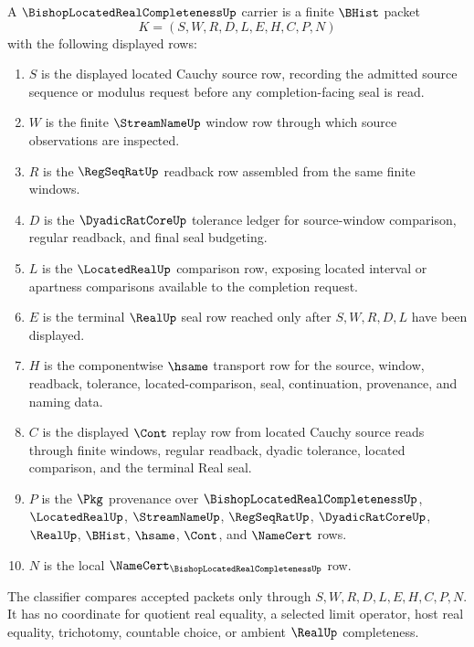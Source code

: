 \begin{definition}
\label{def:bishop-located-real-completeness-carrier}
A $\BishopLocatedRealCompletenessUp$ carrier is a finite $\BHist$ packet
$$
K=(S,W,R,D,L,E,H,C,P,N)
$$
with the following displayed rows:
\begin{enumerate}
\item $S$ is the displayed located Cauchy source row, recording the admitted source sequence or modulus request before any completion-facing seal is read.
\item $W$ is the finite $\StreamNameUp$ window row through which source observations are inspected.
\item $R$ is the $\RegSeqRatUp$ readback row assembled from the same finite windows.
\item $D$ is the $\DyadicRatCoreUp$ tolerance ledger for source-window comparison, regular readback, and final seal budgeting.
\item $L$ is the $\LocatedRealUp$ comparison row, exposing located interval or apartness comparisons available to the completion request.
\item $E$ is the terminal $\RealUp$ seal row reached only after $S,W,R,D,L$ have been displayed.
\item $H$ is the componentwise $\hsame$ transport row for the source, window, readback, tolerance, located-comparison, seal, continuation, provenance, and naming data.
\item $C$ is the displayed $\Cont$ replay row from located Cauchy source reads through finite windows, regular readback, dyadic tolerance, located comparison, and the terminal Real seal.
\item $P$ is the $\Pkg$ provenance over $\BishopLocatedRealCompletenessUp$, $\LocatedRealUp$, $\StreamNameUp$, $\RegSeqRatUp$, $\DyadicRatCoreUp$, $\RealUp$, $\BHist$, $\hsame$, $\Cont$, and $\NameCert$ rows.
\item $N$ is the local $\NameCert_{\BishopLocatedRealCompletenessUp}$ row.
\end{enumerate}
The classifier compares accepted packets only through $S,W,R,D,L,E,H,C,P,N$. It has no coordinate for quotient real equality, a selected limit operator, host real equality, trichotomy, countable choice, or ambient $\RealUp$ completeness.
\end{definition}

